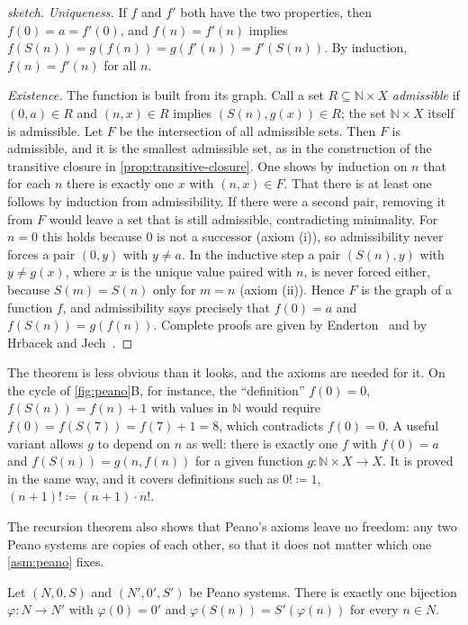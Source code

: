 \begin{proof}[sketch]
\emph{Uniqueness.} If $f$ and $f'$ both have the two properties, then $f(0)=a=f'(0)$, and $f(n)=f'(n)$ implies $f(S(n))=g(f(n))=g(f'(n))=f'(S(n))$. By induction, $f(n)=f'(n)$ for all $n$.

\emph{Existence.} The function is built from its graph. Call a set $R\subseteq\mathbb N\times X$ \emph{admissible} if $(0,a)\in R$ and $(n,x)\in R$ implies $(S(n),g(x))\in R$; the set $\mathbb N\times X$ itself is admissible. Let $F$ be the intersection of all admissible sets. Then $F$ is admissible, and it is the smallest admissible set, as in the construction of the transitive closure in \cref{prop:transitive-closure}. One shows by induction on $n$ that for each $n$ there is exactly one $x$ with $(n,x)\in F$. That there is at least one follows by induction from admissibility. If there were a second pair, removing it from $F$ would leave a set that is still admissible, contradicting minimality. For $n=0$ this holds because $0$ is not a successor (axiom (i)), so admissibility never forces a pair $(0,y)$ with $y\ne a$. In the inductive step a pair $(S(n),y)$ with $y\ne g(x)$, where $x$ is the unique value paired with $n$, is never forced either, because $S(m)=S(n)$ only for $m=n$ (axiom (ii)). Hence $F$ is the graph of a function $f$, and admissibility says precisely that $f(0)=a$ and $f(S(n))=g(f(n))$. Complete proofs are given by Enderton~\cite{enderton1977sets} and by Hrbacek and Jech~\cite{hrbacek1999}.
\end{proof}

The theorem is less obvious than it looks, and the axioms are needed for it. On the cycle of \cref{fig:peano}B, for instance, the ``definition'' $f(0)=0$, $f(S(n))=f(n)+1$ with values in $\mathbb N$ would require $f(0)=f(S(7))=f(7)+1=8$, which contradicts $f(0)=0$. A useful variant allows $g$ to depend on $n$ as well: there is exactly one $f$ with $f(0)=a$ and $f(S(n))=g(n,f(n))$ for a given function $g\colon\mathbb N\times X\to X$. It is proved in the same way, and it covers definitions such as $0!\coloneqq1$, $(n+1)!\coloneqq(n+1)\cdot n!$.

The recursion theorem also shows that Peano's axioms leave no freedom: any two Peano systems are copies of each other, so that it does not matter which one \cref{asm:peano} fixes.

\begin{proposition}[Dedekind]
\label{prop:peano-unique}
Let $(N,0,S)$ and $(N',0',S')$ be Peano systems. There is exactly one bijection $\varphi\colon N\to N'$ with $\varphi(0)=0'$ and $\varphi(S(n))=S'(\varphi(n))$ for every $n\in N$.
\end{proposition}

